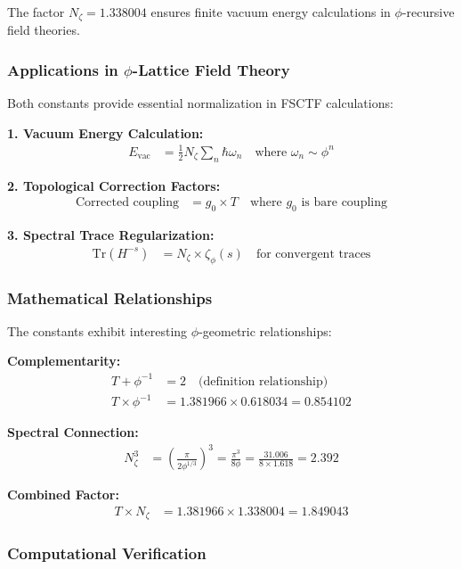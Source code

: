 The factor $N_\zeta = 1.338004$ ensures finite vacuum energy calculations in $\phi$-recursive field theories.

\subsubsection{Applications in $\phi$-Lattice Field Theory}

Both constants provide essential normalization in FSCTF calculations:

\textbf{1. Vacuum Energy Calculation:}
\begin{align}
E_{\text{vac}} &= \frac{1}{2} N_\zeta \sum_{n} \hbar \omega_n \quad \text{where } \omega_n \sim \phi^n
\end{align}

\textbf{2. Topological Correction Factors:}
\begin{align}
\text{Corrected coupling} &= g_0 \times T \quad \text{where } g_0 \text{ is bare coupling}
\end{align}

\textbf{3. Spectral Trace Regularization:}
\begin{align}
\text{Tr}(H^{-s}) &= N_\zeta \times \zeta_\phi(s) \quad \text{for convergent traces}
\end{align}

\subsubsection{Mathematical Relationships}

The constants exhibit interesting $\phi$-geometric relationships:

\textbf{Complementarity:}
\begin{align}
T + \phi^{-1} &= 2 \quad \text{(definition relationship)} \\
T \times \phi^{-1} &= 1.381966 \times 0.618034 = 0.854102
\end{align}

\textbf{Spectral Connection:}
\begin{align}
N_\zeta^3 &= \left(\frac{\pi}{2\phi^{1/3}}\right)^3 = \frac{\pi^3}{8\phi} = \frac{31.006}{8 \times 1.618} = 2.392
\end{align}

\textbf{Combined Factor:}
\begin{align}
T \times N_\zeta &= 1.381966 \times 1.338004 = 1.849043
\end{align}

\subsubsection{Computational Verification}

